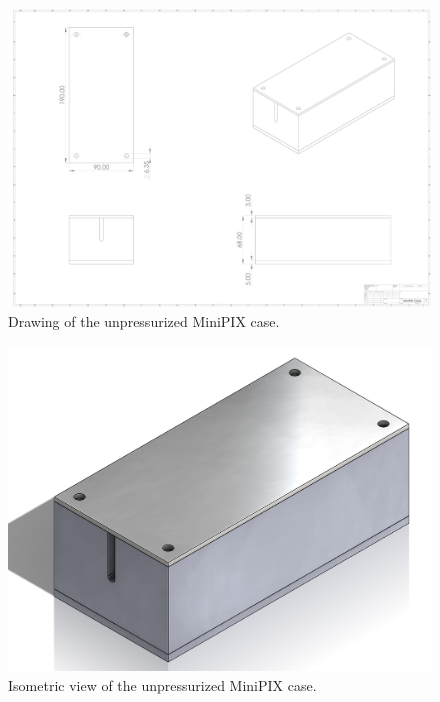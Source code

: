 \begin{centering}
  \begin{figure}[h]
    \includegraphics[width=\textwidth]{Figures/minipix-case.pdf}
    \caption{Drawing of the unpressurized MiniPIX case.}
    \label{fig:minipix-case-drawing}
  \end{figure}  
  \begin{figure}[h]
    \includegraphics[width=\textwidth]{Figures/minipix-case-closed.png}
    \caption{Isometric view of the unpressurized MiniPIX case.}
    \label{fig:minipix-case-closed-image}
  \end{figure}
  \begin{figure}[h]

\end{figure}
\end{centering}
